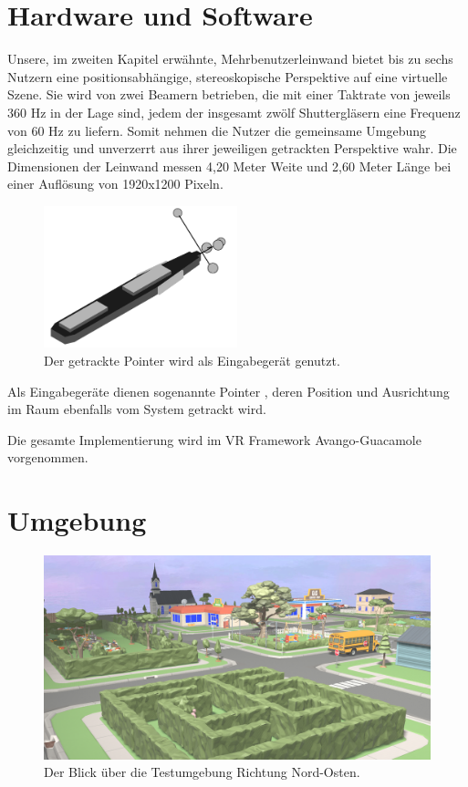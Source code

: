 \section{Hardware und Software}
Unsere, im zweiten Kapitel erwähnte, Mehrbenutzerleinwand bietet bis zu sechs Nutzern eine positionsabhängige, stereoskopische Perspektive auf eine virtuelle Szene. Sie wird von zwei Beamern betrieben, die mit einer Taktrate von jeweils 360 Hz in der Lage sind, jedem der insgesamt zwölf Shuttergläsern eine Frequenz von 60 Hz zu liefern. Somit nehmen die Nutzer die gemeinsame Umgebung gleichzeitig und unverzerrt aus ihrer jeweiligen getrackten Perspektive wahr. Die Dimensionen der Leinwand messen 4,20 Meter Weite und 2,60 Meter Länge bei einer Auflösung von 1920x1200 Pixeln.

\begin{figure}[h]
  \centering
  \includegraphics[width=0.5\textwidth]{images/pointer.png}
  \caption{Der getrackte Pointer wird als Eingabegerät genutzt.}
  \label{fig:todo}
\end{figure}

Als Eingabegeräte dienen sogenannte \glqq Pointer \grqq{}, deren Position und Ausrichtung im Raum ebenfalls vom System getrackt wird.

Die gesamte Implementierung wird im VR Framework Avango-Guacamole \cite{Schneegans2014Guacamole-AnShading} vorgenommen.

\section{Umgebung}



\begin{figure}[h]
  \centering
  \includegraphics[width=\textwidth]{images/map2.png}
  \caption{Der Blick über die Testumgebung Richtung Nord-Osten.}
  \label{fig:todo}
\end{figure}

